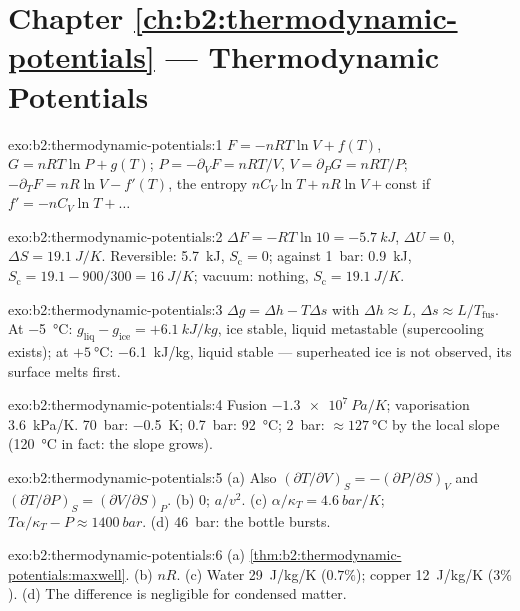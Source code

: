 \section*{Chapter \ref{ch:b2:thermodynamic-potentials} --- Thermodynamic Potentials}

\begin{solution}{exo:b2:thermodynamic-potentials:1}
$F = -nRT\ln V + f(T)$, $G = nRT\ln P + g(T)$; $P = -\partial_VF = nRT/V$,
$V = \partial_PG = nRT/P$; $-\partial_TF = nR\ln V - f'(T)$, the entropy
$nC_V\ln T + nR\ln V + \text{const}$ if $f' = -nC_V\ln T + \dots$
\end{solution}

\begin{solution}{exo:b2:thermodynamic-potentials:2}
$\Delta F = -RT\ln 10 = \qty{-5.7}{kJ}$, $\Delta U = 0$, $\Delta S = \qty{19.1}{J/K}$.
Reversible: \qty{5.7}{kJ}, $S_{\text{c}} = 0$; against \qty{1}{bar}: \qty{0.9}{kJ},
$S_{\text{c}} = 19.1 - 900/300 = \qty{16}{J/K}$; vacuum: nothing, $S_{\text{c}} =
\qty{19.1}{J/K}$.
\end{solution}

\begin{solution}{exo:b2:thermodynamic-potentials:3}
$\Delta g = \Delta h - T\Delta s$ with $\Delta h \approx L$, $\Delta s \approx L/T_{\text{fus}}$.
At \qty{-5}{\celsius}: $g_{\text{liq}} - g_{\text{ice}} = +\qty{6.1}{kJ/kg}$, ice
stable, liquid metastable (supercooling exists); at $+\qty{5}{\celsius}$:
\qty{-6.1}{kJ/kg}, liquid stable --- superheated ice is not observed, its
surface melts first.
\end{solution}

\begin{solution}{exo:b2:thermodynamic-potentials:4}
Fusion $\qty{-1.3e7}{Pa/K}$; vaporisation \qty{3.6}{kPa/K}. \qty{70}{bar}:
\qty{-0.5}{K}; \qty{0.7}{bar}: \qty{92}{\celsius}; \qty{2}{bar}: $\approx
\qty{127}{\celsius}$ by the local slope (\qty{120}{\celsius} in fact: the
slope grows).
\end{solution}

\begin{solution}{exo:b2:thermodynamic-potentials:5}
(a) Also $(\partial T/\partial V)_S = -(\partial P/\partial S)_V$ and
$(\partial T/\partial P)_S = (\partial V/\partial S)_P$. (b) $0$; $a/v^2$. (c)
$\alpha/\kappa_T = \qty{4.6}{bar/K}$; $T\alpha/\kappa_T - P \approx \qty{1400}{bar}$.
(d) \qty{46}{bar}: the bottle bursts.
\end{solution}

\begin{solution}{exo:b2:thermodynamic-potentials:6}
(a) \cref{thm:b2:thermodynamic-potentials:maxwell}. (b) $nR$. (c) Water
\qty{29}{J/kg/K} ($0.7\%$); copper \qty{12}{J/kg/K} ($3\%$). (d) The
difference is negligible for condensed matter.
\end{solution}

